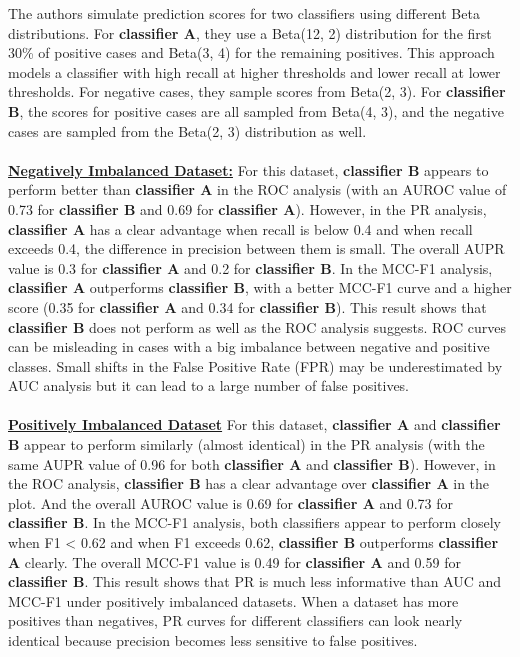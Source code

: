 \documentclass[12pt, oneside]{amsart}
\theoremstyle{definition}
\theoremstyle{remark}
\numberwithin{equation}{section}
\begin{document}
The authors simulate prediction scores for two classifiers using different Beta distributions. For \textbf{classifier A}, they use a Beta(12, 2) distribution for the first 30\% of positive cases and Beta(3, 4) for the remaining positives. This approach models a classifier with high recall at higher thresholds and lower recall at lower thresholds. For negative cases, they sample scores from Beta(2, 3). For \textbf{classifier B}, the scores for positive cases are all sampled from Beta(4, 3), and the negative cases are sampled from the Beta(2, 3) distribution as well. \\
\\
\underline{\textbf{Negatively Imbalanced Dataset:}}
For this dataset,  \textbf{classifier B} appears to perform better than \textbf{classifier A} in the ROC analysis (with an AUROC value of 0.73 for \textbf{classifier B} and 0.69 for \textbf{classifier A}). However, in the PR analysis, \textbf{classifier A} has a clear advantage when recall is below 0.4 and when recall exceeds 0.4, the difference in precision between them is small.  The overall AUPR value is 0.3 for \textbf{classifier A} and 0.2 for \textbf{classifier B}. In the MCC-F1 analysis, \textbf{classifier A} outperforms \textbf{classifier B}, with a better MCC-F1 curve and a higher score (0.35 for \textbf{classifier A} and 0.34 for \textbf{classifier B}). This result shows that \textbf{classifier B} does not perform as well as the ROC analysis suggests. ROC curves can be misleading in cases with a big imbalance between negative and positive classes. Small shifts in the False Positive Rate (FPR) may be underestimated by AUC analysis but it can lead to a large number of false positives. \\
\\
\underline{\textbf{Positively Imbalanced Dataset}}
For this dataset, \textbf{classifier A} and  \textbf{classifier B} appear to perform similarly (almost identical) in the PR analysis (with the same AUPR value of 0.96 for both \textbf{classifier A} and \textbf{classifier B}). However, in the ROC analysis, \textbf{classifier B} has a clear advantage over \textbf{classifier A} in the plot. And the overall AUROC value is 0.69 for \textbf{classifier A} and 0.73 for \textbf{classifier B}. In the MCC-F1 analysis, both classifiers appear to perform closely when F1 < 0.62 and when F1 exceeds 0.62, \textbf{classifier B} outperforms \textbf{classifier A} clearly.  The overall MCC-F1 value is 0.49 for \textbf{classifier A} and 0.59 for \textbf{classifier B}. This result shows that PR is much less informative than AUC and MCC-F1 under positively imbalanced datasets.  When a dataset has more positives than negatives, PR curves for different classifiers can look nearly identical because precision becomes less sensitive to false positives. \\
\end{document}
